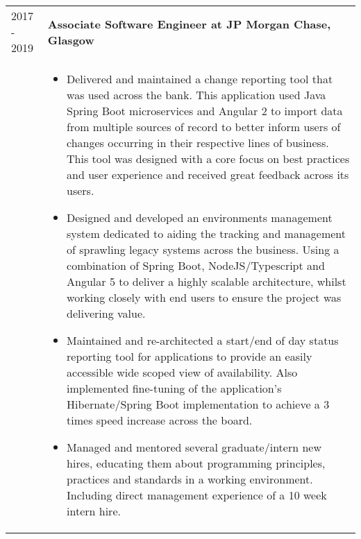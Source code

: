 \begin{tabular}{p{60pt}|p{11cm}}
    \hspace*{\fill}\textsc{2017 - 2019} & \textbf{Associate Software Engineer at JP Morgan Chase, Glasgow}    \\

    & \vspace{-0.9em}\begin{itemize}[itemsep=0pt,topsep=0pt,leftmargin=*]
                         \small
                         \item Delivered and maintained a change reporting tool that was used across the bank.
                         This application used Java Spring Boot microservices and Angular 2 to import data from multiple sources of record to better inform users of changes occurring in their respective lines of business.
                         This tool was designed with a core focus on best practices and user experience and received great feedback across its users.
                         \small
                         \item Designed and developed an environments management system dedicated to aiding the tracking and management of sprawling legacy systems across the business.
                         Using a combination of Spring Boot, NodeJS/Typescript and Angular 5 to deliver a highly scalable architecture, whilst working closely with end users to ensure the project was delivering value.
                         \item Maintained and re-architected a start/end of day status reporting tool for applications to provide an easily accessible wide scoped view of availability.
                         Also implemented fine-tuning of the application's Hibernate/Spring Boot implementation to achieve a 3 times speed increase across the board.
                         \item Managed and mentored several graduate/intern new hires, educating them about programming principles, practices and standards in a working environment.
                         Including direct management experience of a 10 week intern hire.
    \end{itemize}

\end{tabular} \\ \\ \\

